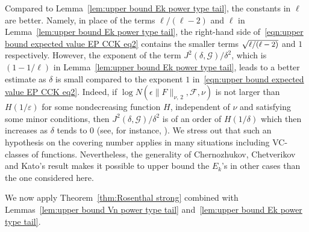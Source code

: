 \documentclass[AHL,Unicode,longabstracts,published]{cedram}
\newcommand{\cG}{\mathcal{G}}
\newcommand{\caF}{\mathscr{F}}
\begin{document}
Compared to Lemma~\ref{lem:upper bound Ek power type tail}, the constants in $\ell$ are better. Namely, in place of the terms $\ell/(\ell-2)$ and $\ell$ in Lemma~\ref{lem:upper bound Ek power type tail}, the right-hand side of~\eqref{eqn:upper bound expected value EP CCK eq2} contains the smaller terms $\sqrt{\text{\small{$\ell/(\ell-2)$}}}$ and $1$ respectively. However, the exponent of the term $J^2(\delta,\cG)/\delta^2$, which is $(1-1/\ell)$ in Lemma~\ref{lem:upper bound Ek power type tail}, leads to a better estimate as $\delta$ is small compared to the exponent $1$ in~\eqref{eqn:upper bound expected value EP CCK eq2}. Indeed, if $\log N(\epsilon\|F\|_{\nu,\,2},\caF, \nu)$ is not larger than $H(1/\varepsilon)$ for some nondecreasing function $H$, independent of $\nu$ and satisfying some minor conditions, then $J^2(\delta,\cG)/\delta^2$ is of an order of $H(1/\delta)$ which then increases as $\delta$ tends to $0$ (see, for instance, \cite[Theorem~3.5.6]{GN16}). We stress out that such an hypothesis on the covering number applies in many situations including VC-classes of functions. Nevertheless, the generality of Chernozhukov, Chetverikov and Kato's result makes it possible to upper bound the $E_k$'s in other cases than the one considered here.

We now apply Theorem~\ref{thm:Rosenthal strong} combined with Lemmas~\ref{lem:upper bound Vn power type tail} and~\ref{lem:upper bound Ek power type tail}.
\end{document}
